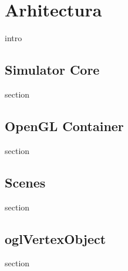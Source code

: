 \chapter{Arhitectura}

intro

\section{Simulator Core}

section

\section{OpenGL Container}
 
section 

\section{Scenes}

section

\section{oglVertexObject}

section